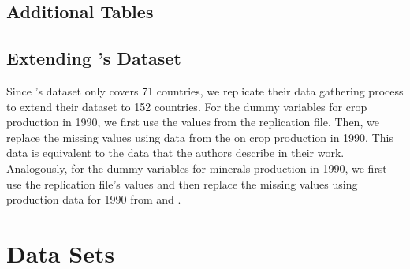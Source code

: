 \renewcommand{\thesubsection}{\Alph{subsection}}

\setcounter{table}{0}
\subsection{Additional Tables}



\restoregeometry


\restoregeometry



\restoregeometry



\restoregeometry


\restoregeometry


\subsection{Extending \citet{easterlyReplicationData}'s Dataset} \label{subsubsec:easterly-data}
Since \citet{easterlyReplicationData}'s dataset only covers 71 countries, we replicate their data gathering process to extend their dataset to 152 countries. For the dummy variables for crop production in 1990, we first use the values from the replication file. Then, we replace the missing values using data from the \citet{foodandagricultureassociationoftheunitednationsFAOGlobalStatistical2020} on crop production in 1990. This data is equivalent to the data that the authors describe in their work. Analogously, for the dummy variables for minerals production in 1990, we first use the replication file's values and then replace the missing values using production data for 1990 from \citet{CopperStatistics} and \citet{SilverStatistics}. 
\newpage
\section*{Data Sets}

{\footnotesize }

% 
% 

